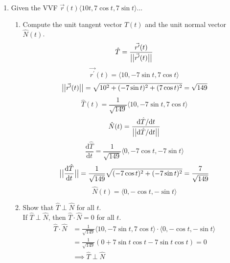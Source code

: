 \begin{enumerate}
	\item Given the VVF $\vec{r}(t)\langle 10t, 7\cos{t}, 7\sin{t} \rangle$...
	\begin{enumerate}[label=\alph*.]
		\item Compute the unit tangent vector $\hat{T}(t)$ and the unit normal vector $\hat{N}(t)$.
		\begin{equation*}
			\hat{T} = \frac{\vec{r^\prime}(t)}{\big\lvert \big\lvert \vec{r^\prime}(t) \big\rvert \big\rvert}
		\end{equation*}
		\begin{equation*}
			\vec{r^\prime}(t) = \langle 10, -7\sin{t}, 7\cos{t} \rangle
		\end{equation*}
		\begin{equation*}
			\big\lvert \big\lvert \vec{r^\prime}(t) \big\rvert \big\rvert = \sqrt{10^2 + (-7\sin{t})^2 + (7\cos{t})^2} = \sqrt{149}
		\end{equation*}
		\begin{equation*}
			\hat{T}(t) = \frac{1}{\sqrt{149}}\langle 10, -7\sin{t}, 7\cos{t} \rangle
		\end{equation*}
		\begin{equation*}
			\hat{N}(t) = \frac{\mathrm{d}\hat{T}/\mathrm{d}t}{\big\lvert \big\lvert \mathrm{d}\hat{T}/\mathrm{d}t \big\rvert \big\rvert}
		\end{equation*}
		\begin{equation*}
			\frac{\mathrm{d}\hat{T}}{\mathrm{d}t} = \frac{1}{\sqrt{149}} \langle 0, -7\cos{t}, -7\sin{t} \rangle
		\end{equation*}
		\begin{equation*}
			\big\lvert \big\lvert \frac{\mathrm{d}\hat{T}}{\mathrm{d}t} \big\rvert \big\rvert = \frac{1}{\sqrt{149}}\sqrt{(-7\cos{t})^2 + (-7\sin{t})^2} = \frac{7}{\sqrt{149}}
		\end{equation*}
		\begin{equation*}
			\hat{N}(t) = \langle 0, -\cos{t},-\sin{t}\rangle
		\end{equation*}
		
		\item Show that $\hat{T}\perp\hat{N}$ for all $t$.\\
		If $\hat{T}\perp\hat{N}$, then $\hat{T}\cdot\hat{N} = 0$ for all $t$.\\
		\begin{align*}
			\hat{T} \cdot \hat{N} &= \frac{1}{\sqrt{149}}\langle 10, -7\sin{t}, 7\cos{t} \rangle \cdot \langle 0, -\cos{t}, -\sin{t}\rangle	\\
			&= \frac{1}{\sqrt{149}}(0 + 7\sin{t}\cos{t} - 7\sin{t}\cos{t}) = 0 \\
			&\implies \hat{T}\perp\hat{N}
		\end{align*}
	\end{enumerate}
	

\end{enumerate}

